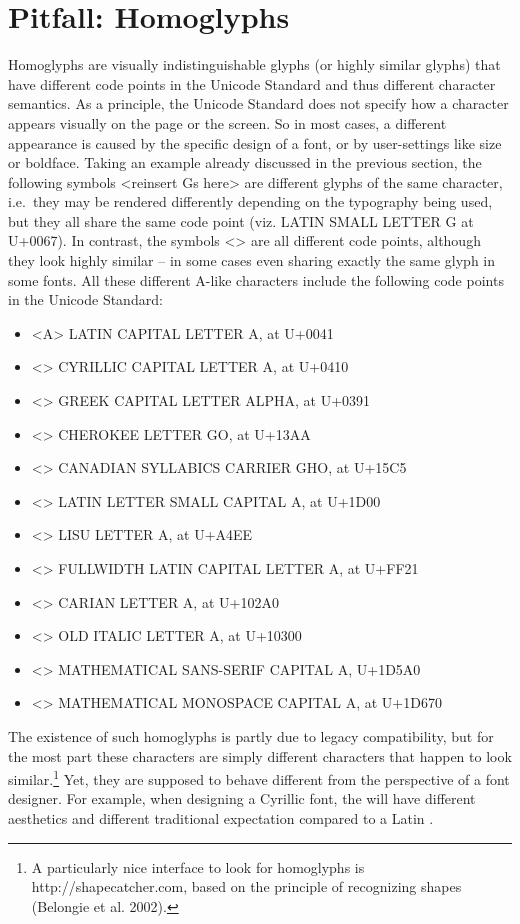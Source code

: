 \section{Pitfall: Homoglyphs}
\label{pitfall-homoglyphs}

Homoglyphs are visually indistinguishable glyphs (or highly similar glyphs) that have different code points in the Unicode Standard and thus different character semantics. As a principle, the Unicode Standard does not specify how a character appears visually on the page or the screen. So in most cases, a different appearance is caused by the specific design of a font, or by user-settings like size or boldface. Taking an example already discussed in the previous section, the following symbols <reinsert Gs here> are different glyphs of the same character, i.e.~they may be rendered differently depending on the typography being used, but they all share the same code point (viz. LATIN SMALL LETTER G at U+0067). In contrast, the symbols <> are all different code points, although they look highly similar -- in some cases even sharing exactly the same glyph in some fonts. All these different A-like characters include the following code points in the Unicode Standard:
\begin{itemize}
	\item <A> LATIN CAPITAL LETTER A, at U+0041 
	\item <> CYRILLIC CAPITAL LETTER A, at U+0410 
	\item <> GREEK CAPITAL LETTER ALPHA, at U+0391 
	\item <> CHEROKEE LETTER GO, at U+13AA 
	\item <> CANADIAN SYLLABICS CARRIER GHO, at U+15C5 
	\item <> LATIN LETTER SMALL CAPITAL A, at U+1D00 
	\item <> LISU LETTER A, at U+A4EE 
	\item <> FULLWIDTH LATIN CAPITAL LETTER A, at U+FF21 
	\item <> CARIAN LETTER A, at U+102A0 
	\item <> OLD ITALIC LETTER A, at U+10300 
	\item <> MATHEMATICAL SANS-SERIF CAPITAL A, U+1D5A0 
	\item <> MATHEMATICAL MONOSPACE CAPITAL A, at U+1D670 
\end{itemize}

The existence of such homoglyphs is partly due to legacy compatibility, but for the most part these characters are simply different characters that happen to look similar.\footnote{A particularly nice interface to look for homoglyphs is http://shapecatcher.com, based on the principle of recognizing shapes (Belongie et al. 2002).} Yet, they are supposed to behave different from the perspective of a font designer. For example, when designing a Cyrillic font, the will have different aesthetics and different traditional expectation compared to a Latin .

